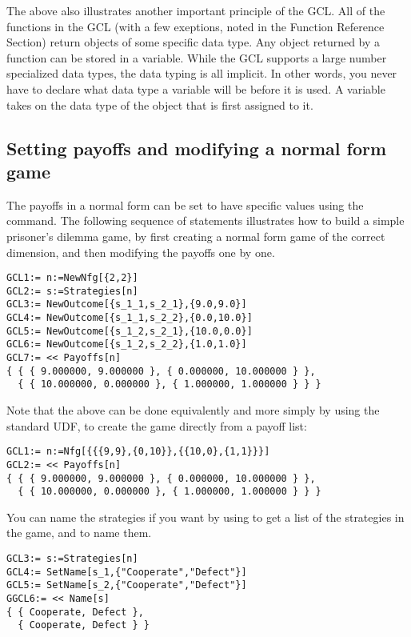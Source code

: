The above also illustrates another important principle of the GCL.
All of the functions in the GCL (with a few exeptions, noted in the
Function Reference Section) return objects of some specific data type.
Any object returned by a function can be stored in a variable.  While
the GCL supports a large number specialized data types, the data
typing is all implicit.  In other words, you never have to declare
what data type a variable will be before it is used.  A variable takes
on the data type of the object that is first assigned to it.    

\subsection{Setting payoffs and modifying a normal form
game}  

The payoffs in a normal form can be set to have specific values using
the  command.  The following sequence of statements
illustrates how to build a simple prisoner's dilemma game, by first
creating a normal form game of the correct dimension, and then
modifying the payoffs one by one.  

\begin{verbatim}
GCL1:= n:=NewNfg[{2,2}]
GCL2:= s:=Strategies[n]
GCL3:= NewOutcome[{s_1_1,s_2_1},{9.0,9.0}]
GCL4:= NewOutcome[{s_1_1,s_2_2},{0.0,10.0}]
GCL5:= NewOutcome[{s_1_2,s_2_1},{10.0,0.0}]
GCL6:= NewOutcome[{s_1_2,s_2_2},{1.0,1.0}]
GCL7:= << Payoffs[n]
{ { { 9.000000, 9.000000 }, { 0.000000, 10.000000 } },
  { { 10.000000, 0.000000 }, { 1.000000, 1.000000 } } }
\end{verbatim}

Note that the above can be done equivalently and more simply by using
the standard UDF,  to create the game directly from a payoff
list:

\begin{verbatim}
GCL1:= n:=Nfg[{{{9,9},{0,10}},{{10,0},{1,1}}}]
GCL2:= << Payoffs[n]
{ { { 9.000000, 9.000000 }, { 0.000000, 10.000000 } },
  { { 10.000000, 0.000000 }, { 1.000000, 1.000000 } } }
\end{verbatim}

\noindent
You can name the strategies if you want by using  to
get a list of the strategies in the game, and  to name
them.

\begin{verbatim}
GCL3:= s:=Strategies[n]
GCL4:= SetName[s_1,{"Cooperate","Defect"}]
GCL5:= SetName[s_2,{"Cooperate","Defect"}]
GGCL6:= << Name[s]
{ { Cooperate, Defect },
  { Cooperate, Defect } }
\end{verbatim}

